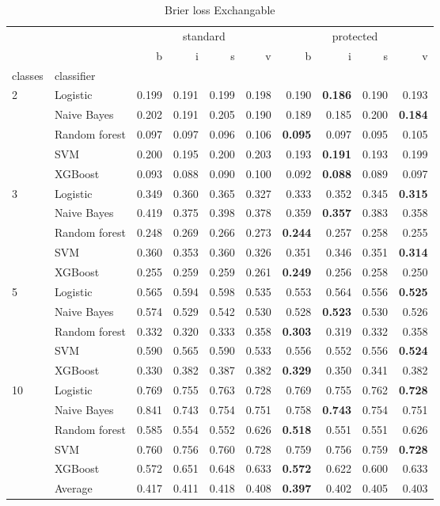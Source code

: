 \begin{table}
\caption{Brier loss Exchangable}
\begin{tabular}{l|l|rrrr|rrrr}
\toprule
 &  & \multicolumn{4}{c}{standard} & \multicolumn{4}{c}{protected} \\
 &  & b & i & s & v & b & i & s & v \\
classes & classifier &  &  &  &  &  &  &  &  \\
\midrule
\midrule
\multirow[c]{5}{*}{2} & Logistic & 0.199 & 0.191 & 0.199 & 0.198 & 0.190 & \textbf{0.186} & 0.190 & 0.193 \\
 & Naive Bayes & 0.202 & 0.191 & 0.205 & 0.190 & 0.189 & 0.185 & 0.200 & \textbf{0.184} \\
 & Random forest & 0.097 & 0.097 & 0.096 & 0.106 & \textbf{0.095} & 0.097 & 0.095 & 0.105 \\
 & SVM & 0.200 & 0.195 & 0.200 & 0.203 & 0.193 & \textbf{0.191} & 0.193 & 0.199 \\
 & XGBoost & 0.093 & 0.088 & 0.090 & 0.100 & 0.092 & \textbf{0.088} & 0.089 & 0.097 \\
\midrule
\multirow[c]{5}{*}{3} & Logistic & 0.349 & 0.360 & 0.365 & 0.327 & 0.333 & 0.352 & 0.345 & \textbf{0.315} \\
 & Naive Bayes & 0.419 & 0.375 & 0.398 & 0.378 & 0.359 & \textbf{0.357} & 0.383 & 0.358 \\
 & Random forest & 0.248 & 0.269 & 0.266 & 0.273 & \textbf{0.244} & 0.257 & 0.258 & 0.255 \\
 & SVM & 0.360 & 0.353 & 0.360 & 0.326 & 0.351 & 0.346 & 0.351 & \textbf{0.314} \\
 & XGBoost & 0.255 & 0.259 & 0.259 & 0.261 & \textbf{0.249} & 0.256 & 0.258 & 0.250 \\
\midrule
\multirow[c]{5}{*}{5} & Logistic & 0.565 & 0.594 & 0.598 & 0.535 & 0.553 & 0.564 & 0.556 & \textbf{0.525} \\
 & Naive Bayes & 0.574 & 0.529 & 0.542 & 0.530 & 0.528 & \textbf{0.523} & 0.530 & 0.526 \\
 & Random forest & 0.332 & 0.320 & 0.333 & 0.358 & \textbf{0.303} & 0.319 & 0.332 & 0.358 \\
 & SVM & 0.590 & 0.565 & 0.590 & 0.533 & 0.556 & 0.552 & 0.556 & \textbf{0.524} \\
 & XGBoost & 0.330 & 0.382 & 0.387 & 0.382 & \textbf{0.329} & 0.350 & 0.341 & 0.382 \\
\midrule
\multirow[c]{5}{*}{10} & Logistic & 0.769 & 0.755 & 0.763 & 0.728 & 0.769 & 0.755 & 0.762 & \textbf{0.728} \\
 & Naive Bayes & 0.841 & 0.743 & 0.754 & 0.751 & 0.758 & \textbf{0.743} & 0.754 & 0.751 \\
 & Random forest & 0.585 & 0.554 & 0.552 & 0.626 & \textbf{0.518} & 0.551 & 0.551 & 0.626 \\
 & SVM & 0.760 & 0.756 & 0.760 & 0.728 & 0.759 & 0.756 & 0.759 & \textbf{0.728} \\
 & XGBoost & 0.572 & 0.651 & 0.648 & 0.633 & \textbf{0.572} & 0.622 & 0.600 & 0.633 \\\midrule\ & Average & 0.417 & 0.411 & 0.418 & 0.408 & \textbf{0.397} & 0.402 & 0.405 & 0.403 \\
\bottomrule
\end{tabular}
\end{table}
